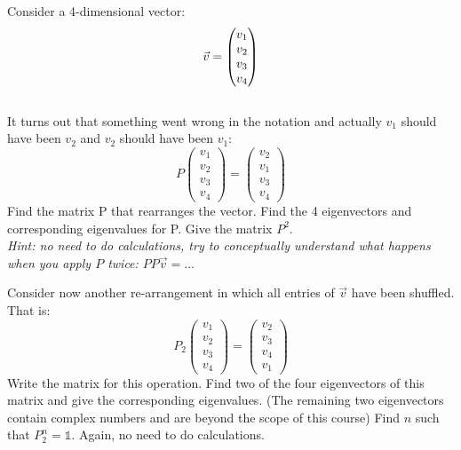 \documentclass[a4paper]{report}
\begin{document}
\begin{Exercise}[label=eigen3,title=Re-arranging, difficulty=3]
Consider a 4-dimensional vector:
\begin{equation*}
\vec{v} = \begin{pmatrix} v_1 \\ v_2 \\ v_3 \\ v_4 \end{pmatrix}\vspace{0.5ex}
\end{equation*}
\vspace{0.5ex}
\ExePart \\
It turns out that something went wrong in the notation and actually $v_1$ should have been $v_2$ and $v_2$ should have been $v_1$:
\begin{equation*}
P \begin{pmatrix} v_1 \\ v_2 \\ v_3 \\ v_4 \end{pmatrix} =  \begin{pmatrix} v_2 \\ v_1 \\ v_3 \\ v_4 \end{pmatrix}
\end{equation*}
\Question Find the matrix P that rearranges the vector.
\Question Find the 4 eigenvectors and corresponding eigenvalues for P.
\Question Give the matrix $P^2$. \\ \textit{Hint: no need to do calculations, try to conceptually understand what happens when you apply $P$ twice: $PP\vec{v} = \dots $}

\vspace{0.5ex}
\ExePart
Consider now another re-arrangement in which all entries of $\vec{v}$ have been shuffled. That is:
\begin{equation*}
P_2 \begin{pmatrix} v_1 \\ v_2 \\ v_3 \\ v_4 \end{pmatrix} =  \begin{pmatrix} v_2 \\ v_3 \\ v_4 \\ v_1 \end{pmatrix}
\end{equation*}
\Question Write the matrix for this operation.
\Question Find two of the four eigenvectors of this matrix and give the corresponding eigenvalues. (The remaining two eigenvectors contain complex numbers and are beyond the scope of this course) 
\Question Find $n$ such that $P_2^n =\mathbb{1}$. Again, no need to do calculations.

\end{Exercise}
\end{document}
